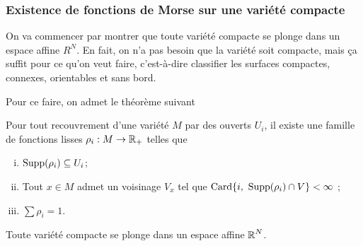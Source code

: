 \subsubsection{Existence de fonctions de Morse sur une variété compacte}
On va commencer par montrer que toute variété compacte se plonge dans un espace affine $R^N$. 
En fait, on n'a pas besoin que la variété soit compacte, mais ça suffit pour ce qu'on veut faire, 
c'est-à-dire classifier les surfaces compactes, connexes, orientables et sans bord.

Pour ce faire, on admet le théorème suivant 
\begin{thm}
    Pour tout recouvrement d'une variété $M$ par des ouverts $U_i$, il existe une famille 
    de fonctions lisses $\rho_i:M\to \operatorname{\mathbb R}_+$ telles que 
    \begin{enumerate}[(i)]
        \item $\operatorname{Supp}(\rho_i)\subseteq U_i$;
        \item Tout $x\in M$ admet un voisinage $V_x$ tel que 
        $\operatorname{Card}\lbrace i,\ \operatorname{Supp}(\rho_i)\cap V\rbrace<\infty$ ;
        \item $\sum\rho_i=1$.
    \end{enumerate}
\end{thm}

\begin{thm}
    Toute variété compacte se plonge dans un espace affine $\operatorname{\mathbb R}^N$.
\end{thm}

